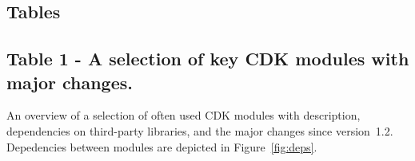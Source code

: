\documentclass[10pt]{bmcart}
\begin{document}
\begin{backmatter}


\newpage


\newpage

\section*{Tables}

  \subsection*{Table 1 - A selection of key CDK modules with major changes.}
  \label{tab:modules}
  An overview of a selection of often used CDK modules with description,
  dependencies on third-party libraries, and the major changes since
  version~1.2. Depedencies between modules are depicted in Figure~\ref{fig:deps}.
  \baselineskip


\end{backmatter}
\end{document}
